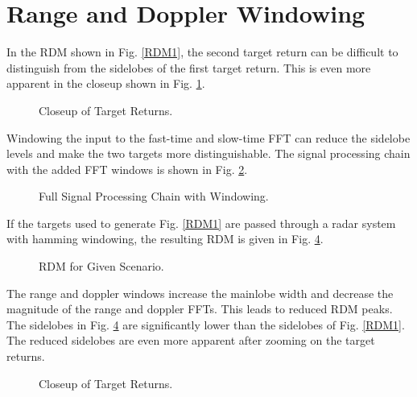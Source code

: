\documentclass[conference]{IEEEtran}
\begin{document}
\section{Range and Doppler Windowing}
In the RDM shown in Fig. \ref{RDM1}, the second target return can be difficult to distinguish from the sidelobes of the first target return. This is even more apparent in the closeup shown in Fig. \ref{RDM1_close}.
\begin{figure}[H]
\centerline{}
\caption{Closeup of Target Returns.}
\label{RDM1_close}
\end{figure}
\noindent
Windowing the input to the fast-time and slow-time FFT can reduce the sidelobe levels and make the two targets more distinguishable. The signal processing chain with the added FFT windows is shown in Fig. \ref{Full_Chain}.
\begin{figure}[H]
\centerline{}
\caption{Full Signal Processing Chain with Windowing.}
\label{Full_Chain}
\end{figure}
\noindent
If the targets used to generate Fig. \ref{RDM1} are passed through a radar system with hamming windowing, the resulting RDM is given in Fig. \ref{RDM2}.
\begin{figure}[H]
\centerline{}
\caption{RDM for Given Scenario.}
\label{RDM2}
\end{figure}
\noindent
The range and doppler windows increase the mainlobe width and decrease the magnitude of the range and doppler FFTs. This leads to reduced RDM peaks. The sidelobes in Fig. \ref{RDM2} are significantly lower than the sidelobes of Fig. \ref{RDM1}. The reduced sidelobes are even more apparent after zooming on the target returns.
\begin{figure}[H]
\centerline{}
\caption{Closeup of Target Returns.}
\label{RDM2}
\end{figure}
\end{document}
